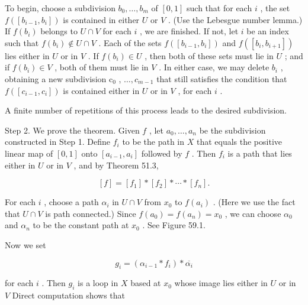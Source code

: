 To begin, choose a subdivision \({b}_{0},\ldots ,{b}_{m}\) of \(\left\lbrack  {0,1}\right\rbrack\) such that for each \(i\) , the set \(f\left( \left\lbrack  {{b}_{i - 1},{b}_{i}}\right\rbrack  \right)\) is contained in either \(U\) or \(V\) . (Use the Lebesgue number lemma.) If \(f\left( {b}_{i}\right)\) belongs to \(U \cap  V\) for each \(i\) , we are finished. If not, let \(i\) be an index such that \(f\left( {b}_{i}\right)  \notin  U \cap  V\) . Each of the sets \(f\left( \left\lbrack  {{b}_{i - 1},{b}_{i}}\right\rbrack  \right)\) and \(f\left( \left\lbrack  {{b}_{i},{b}_{i + 1}}\right\rbrack  \right)\) lies either in \(U\) or in \(V\) . If \(f\left( {b}_{i}\right)  \in  U\) , then both of these sets must lie in \(U\) ; and if \(f\left( {b}_{i}\right)  \in  V\) , both of them must lie in \(V\) . In either case, we may delete \({b}_{i}\) , obtaining a new subdivision \({\mathrm{c}}_{0}\) , \(\ldots ,{c}_{m - 1}\) that still satisfies the condition that \(f\left( \left\lbrack  {{c}_{i - 1},{c}_{i}}\right\rbrack  \right)\) is contained either in \(U\) or in \(V\) , for each \(i\) .

A finite number of repetitions of this process leads to the desired subdivision.

Step 2. We prove the theorem. Given \(f\) , let \({a}_{0},\ldots ,{a}_{n}\) be the subdivision constructed in Step 1. Define \({f}_{i}\) to be the path in \(X\) that equals the positive linear map of \(\left\lbrack  {0,1}\right\rbrack\) onto \(\left\lbrack  {{a}_{i - 1},{a}_{i}}\right\rbrack\) followed by \(f\) . Then \({f}_{i}\) is a path that lies either in \(U\) or in \(V\) , and by Theorem 51.3,

\[
\left\lbrack  f\right\rbrack   = \left\lbrack  {f}_{1}\right\rbrack   * \left\lbrack  {f}_{2}\right\rbrack   * \cdots  * \left\lbrack  {f}_{n}\right\rbrack  .
\]

For each \(i\) , choose a path \({\alpha }_{i}\) in \(U \cap  V\) from \({x}_{0}\) to \(f\left( {a}_{i}\right)\) . (Here we use the fact that \(U \cap  V\) is path connected.) Since \(f\left( {a}_{0}\right)  = f\left( {a}_{n}\right)  = {x}_{0}\) , we can choose \({\alpha }_{0}\) and \({\alpha }_{n}\) to be the constant path at \({x}_{0}\) . See Figure 59.1.

Now we set

\[
{g}_{i} = \left( {{\alpha }_{i - 1} * {f}_{i}}\right)  * \overline{{\alpha }_{i}}
\]

for each \(i\) . Then \({g}_{i}\) is a loop in \(X\) based at \({x}_{0}\) whose image lies either in \(U\) or in \(V\) Direct computation shows that

